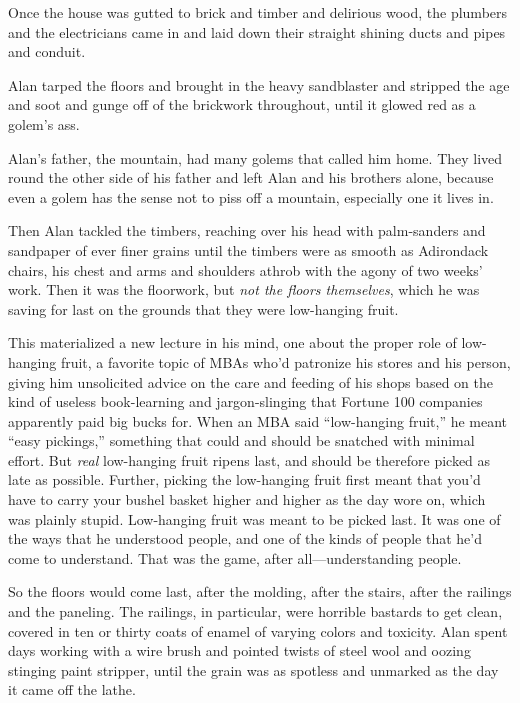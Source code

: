 Once the house was gutted to brick and timber and delirious wood, the
plumbers and the electricians came in and laid down their straight
shining ducts and pipes and conduit.

Alan tarped the floors and brought in the heavy sandblaster and
stripped the age and soot and gunge off of the brickwork throughout,
until it glowed red as a golem's ass.

Alan's father, the mountain, had many golems that called him home. 
They lived round the other side of his father and left Alan and his
brothers alone, because even a golem has the sense not to piss off a
mountain, especially one it lives in.

Then Alan tackled the timbers, reaching over his head with
palm-sanders and sandpaper of ever finer grains until the timbers were
as smooth as Adirondack chairs, his chest and arms and shoulders
athrob with the agony of two weeks' work.  Then it was the floorwork,
but \textit{not the floors themselves}, which he was saving for last
on the grounds that they were low-hanging fruit.

This materialized a new lecture in his mind, one about the proper role
of low-hanging fruit, a favorite topic of MBAs who'd patronize his
stores and his person, giving him unsolicited advice on the care and
feeding of his shops based on the kind of useless book-learning and
jargon-slinging that Fortune 100 companies apparently paid big bucks
for.  When an MBA said ``low-hanging fruit,'' he meant ``easy
pickings,'' something that could and should be snatched with minimal
effort.  But \textit{real} low-hanging fruit ripens last, and should
be therefore picked as late as possible.  Further, picking the
low-hanging fruit first meant that you'd have to carry your bushel
basket higher and higher as the day wore on, which was plainly stupid. 
Low-hanging fruit was meant to be picked last.  It was one of the ways
that he understood people, and one of the kinds of people that he'd
come to understand.  That was the game, after all---understanding
people.

So the floors would come last, after the molding, after the stairs,
after the railings and the paneling.  The railings, in particular,
were horrible bastards to get clean, covered in ten or thirty coats of
enamel of varying colors and toxicity.  Alan spent days working with a
wire brush and pointed twists of steel wool and oozing stinging paint
stripper, until the grain was as spotless and unmarked as the day it
came off the lathe.

